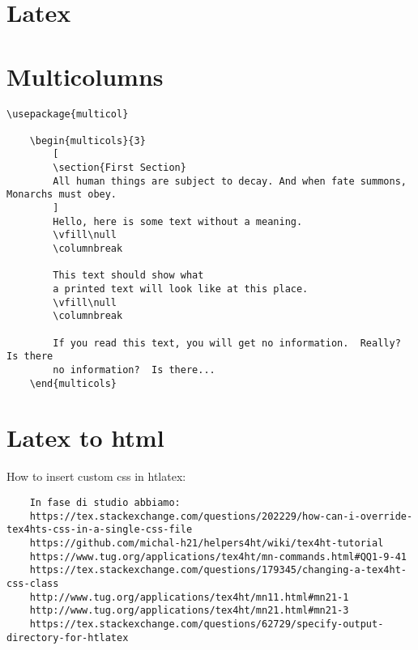 \section{Latex}
\section*{Multicolumns}

\begin{verbatim}
\usepackage{multicol}

	\begin{multicols}{3}
		[
		\section{First Section}
		All human things are subject to decay. And when fate summons, Monarchs must obey.
		]
		Hello, here is some text without a meaning.  
		\vfill\null			
		\columnbreak
		
		This text should show what 
		a printed text will look like at this place.
		\vfill\null
		\columnbreak		
		
		If you read this text, you will get no information.  Really?  Is there 
		no information?  Is there...
	\end{multicols}
\end{verbatim}

\section*{Latex to html}
How to insert custom css in htlatex: 

\begin{verbatim}
	In fase di studio abbiamo:
	https://tex.stackexchange.com/questions/202229/how-can-i-override-tex4hts-css-in-a-single-css-file
	https://github.com/michal-h21/helpers4ht/wiki/tex4ht-tutorial
	https://www.tug.org/applications/tex4ht/mn-commands.html#QQ1-9-41
	https://tex.stackexchange.com/questions/179345/changing-a-tex4ht-css-class
	http://www.tug.org/applications/tex4ht/mn11.html#mn21-1
	http://www.tug.org/applications/tex4ht/mn21.html#mn21-3	
	https://tex.stackexchange.com/questions/62729/specify-output-directory-for-htlatex
\end{verbatim}

